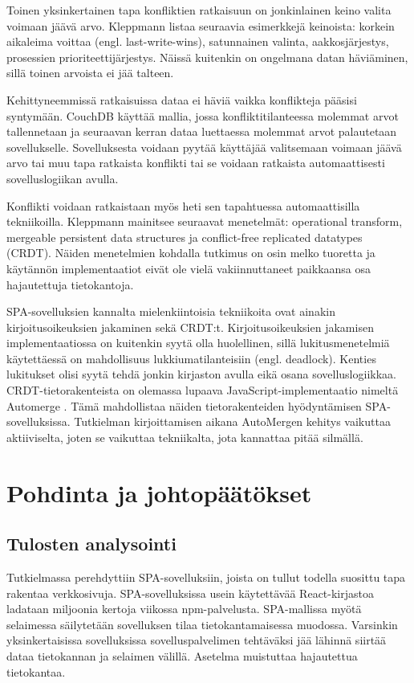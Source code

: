 \documentclass[finnish,twoside,censored,csm,sw-track-2018]{HYthesisML}
\begin{document}
Toinen yksinkertainen tapa konfliktien ratkaisuun on jonkinlainen keino valita voimaan jäävä arvo. Kleppmann \cite{Kleppmann} listaa seuraavia esimerkkejä keinoista: korkein aikaleima voittaa (engl. last-write-wins), satunnainen valinta, aakkosjärjestys, prosessien prioriteettijärjestys. Näissä kuitenkin on ongelmana datan häviäminen, sillä toinen arvoista ei jää talteen.

Kehittyneemmissä ratkaisuissa dataa ei häviä vaikka konflikteja pääsisi syntymään. CouchDB \citep{couchdb} käyttää mallia, jossa konfliktitilanteessa molemmat arvot tallennetaan ja seuraavan kerran dataa luettaessa molemmat arvot palautetaan sovellukselle. Sovelluksesta voidaan pyytää käyttäjää valitsemaan voimaan jäävä arvo tai muu tapa ratkaista konflikti tai se voidaan ratkaista automaattisesti sovelluslogiikan avulla.

Konflikti voidaan ratkaistaan myös heti sen tapahtuessa automaattisilla tekniikoilla. Kleppmann \citep{Kleppmann} mainitsee seuraavat menetelmät: operational transform, mergeable persistent data structures ja conflict-free replicated datatypes (CRDT). Näiden menetelmien kohdalla tutkimus on osin melko tuoretta ja käytännön implementaatiot eivät ole vielä vakiinnuttaneet paikkaansa osa hajautettuja tietokantoja.

SPA-sovelluksien kannalta mielenkiintoisia tekniikoita ovat ainakin kirjoitusoikeuksien jakaminen sekä CRDT:t. Kirjoitusoikeuksien jakamisen implementaatiossa on kuitenkin syytä olla huolellinen, sillä lukitusmenetelmiä käytettäessä on mahdollisuus lukkiumatilanteisiin (engl. deadlock). Kenties lukitukset olisi syytä tehdä jonkin kirjaston avulla eikä osana sovelluslogiikkaa. CRDT-tietorakenteista on olemassa lupaava JavaScript-implementaatio nimeltä Automerge \cite{automerge}. Tämä mahdollistaa näiden tietorakenteiden hyö\-dyntämisen SPA-sovelluksissa. Tutkielman kirjoittamisen aikana AutoMergen kehitys vaikuttaa aktiiviselta, joten se vaikuttaa tekniikalta, jota kannattaa pitää silmällä.

\chapter{Pohdinta ja johtopäätökset}

\section{Tulosten analysointi}

Tutkielmassa perehdyttiin SPA-sovelluksiin, joista on tullut todella suosittu tapa rakentaa verkkosivuja. SPA-sovelluksissa usein käytettävää React-kirjastoa ladataan miljoonia kertoja viikossa npm-palvelusta. SPA-mallissa myötä selaimessa säilytetään sovelluksen tilaa tietokantamaisessa muodossa. Varsinkin yksinkertaisissa sovelluksissa sovelluspalvelimen tehtäväksi jää lähinnä siirtää dataa tietokannan ja selaimen välillä. Asetelma muistuttaa hajautettua tietokantaa.
\end{document}

